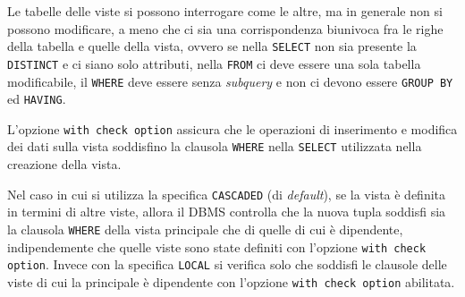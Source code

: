 Le tabelle delle viste si possono interrogare come le altre, ma in generale non si possono
modificare, a meno che ci sia una corrispondenza biunivoca fra le righe della tabella e quelle della vista,
ovvero se nella \verb|SELECT| non sia presente la \verb|DISTINCT| e ci siano solo attributi, nella \verb|FROM|
ci deve essere una sola tabella modificabile, il \verb|WHERE| deve essere senza \emph{subquery} e non ci devono essere
\verb|GROUP BY| ed \verb|HAVING|.

L'opzione \verb|with check option| assicura che le operazioni di inserimento e modifica
dei dati sulla vista soddisfino la clausola \verb|WHERE| nella \verb|SELECT| utilizzata nella
creazione della vista.

Nel caso in cui si utilizza la specifica \verb|CASCADED| (di \emph{default}), se la vista è definita
in termini di altre viste, allora il DBMS controlla che la nuova tupla soddisfi sia la clausola \verb|WHERE| della vista
principale che di quelle di cui è dipendente, indipendemente che quelle viste sono state definiti con l'opzione \verb|with check option|.
Invece con la specifica \verb|LOCAL| si verifica solo che soddisfi le clausole delle viste di cui la principale è dipendente con l'opzione
\verb|with check option| abilitata.